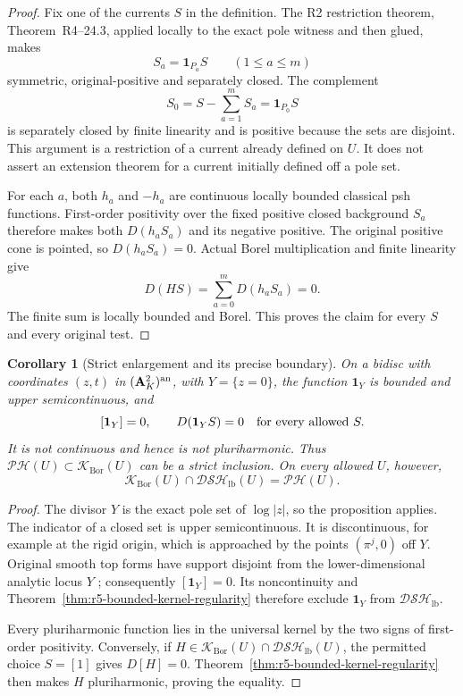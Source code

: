 \documentclass[11pt,a4paper]{article}
\numberwithin{equation}{section}
\newtheorem{corollary}[theorem]{Corollary}
\theoremstyle{definition}
\theoremstyle{remark}
\begin{document}
\begin{proof}
Fix one of the currents $S$ in the definition.  The R2 restriction
theorem, Theorem~\textup{R4--24.3}, applied locally to
the exact pole witness and then glued, makes
\[
                        S_a=\mathbf1_{P_a}S\qquad(1\leq a\leq m)
\]
symmetric, original-positive and separately closed.  The complement
\[
                     S_0=S-\sum_{a=1}^mS_a=\mathbf1_{P_0}S
\]
is separately closed by finite linearity and is positive because the
sets are disjoint.  This argument is a restriction of a current
already defined on $U$.  It does not assert an extension theorem
for a current initially defined off a pole set.

For each $a$, both $h_a$ and $-h_a$ are continuous locally bounded
classical psh functions.  First-order positivity over the fixed
positive closed background $S_a$ therefore makes both
$D(h_aS_a)$ and its negative positive.  The original positive cone
is pointed, so $D(h_aS_a)=0$.  Actual Borel multiplication and
finite linearity give
\[
                   D(HS)=\sum_{a=0}^mD(h_aS_a)=0.
\]
The finite sum is locally bounded and Borel.  This proves the
claim for every $S$ and every original test.
\end{proof}

\begin{corollary}[Strict enlargement and its precise boundary]
\label{cor:r5-universal-borel-kernel-strict}
On a bidisc with coordinates $(z,t)$ in $(\mathbf A_K^2)^{\rm an}$, with
$Y=\{z=0\}$, the function $\mathbf1_Y$ is bounded and upper
semicontinuous, and
\[
       [\mathbf1_Y]=0,\qquad
       D(\mathbf1_Y S)=0\quad\hbox{for every allowed }S.
\]
It is not continuous and hence is not pluriharmonic.  Thus
$\mathscr{PH}(U)\subset\mathscr K_{\mathrm{Bor}}(U)$ can be
a strict inclusion.  On every allowed $U$, however,
\[
 \mathscr K_{\mathrm{Bor}}(U)\cap\mathscr{DSH}_{\mathrm{lb}}(U)
                       =\mathscr{PH}(U).
\]
\end{corollary}

\begin{proof}
The divisor $Y$ is the exact pole set of $\log|z|$, so the
proposition applies.  The indicator of a closed set is upper
semicontinuous.  It is discontinuous, for example at the rigid
origin, which is approached by the points $(\pi^j,0)$ off $Y$.
Original smooth top forms have support disjoint from the
lower-dimensional analytic locus $Y$
\cite[Proposition 15.2.1]{CLD25}; consequently
$[\mathbf1_Y]=0$.  Its noncontinuity and
Theorem~\ref{thm:r5-bounded-kernel-regularity} therefore
exclude $\mathbf1_Y$ from $\mathscr{DSH}_{\mathrm{lb}}$.

Every pluriharmonic function lies in the universal kernel by
the two signs of first-order positivity.  Conversely, if
$H\in\mathscr K_{\mathrm{Bor}}(U)\cap
\mathscr{DSH}_{\mathrm{lb}}(U)$, the permitted choice $S=[1]$
gives $D[H]=0$.  Theorem~\ref{thm:r5-bounded-kernel-regularity}
then makes $H$ pluriharmonic, proving the equality.
\end{proof}
\end{document}
